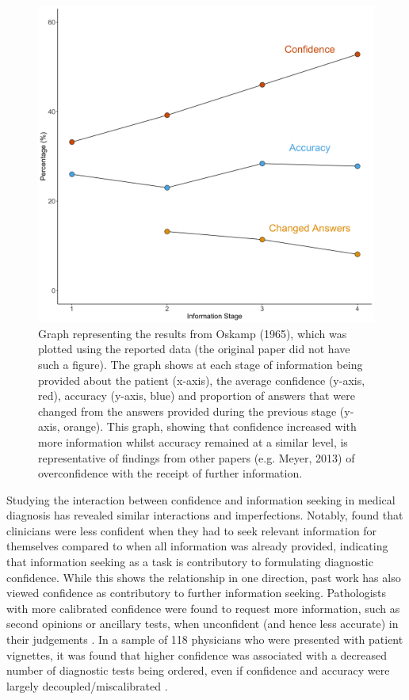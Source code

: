 \documentclass[a4paper, nobind]{templates/ociamthesis}
\begin{document}
\newpage

\begin{figure}[H]

{\centering \includegraphics[width=1\linewidth]{./assets/OskampGraph} 

}

\caption[Graph representing the results from Oskamp (1965)]{Graph representing the results from Oskamp (1965), which was plotted using the reported data (the original paper did not have such a figure). The graph shows at each stage of information being provided about the patient (x-axis), the average confidence (y-axis, red), accuracy (y-axis, blue) and proportion of answers that were changed from the answers provided during the previous stage (y-axis, orange). This graph, showing that confidence increased with more information whilst accuracy remained at a similar level, is representative of findings from other papers (e.g. Meyer, 2013) of overconfidence with the receipt of further information.}\label{fig:oskamp}
\end{figure}

Studying the interaction between confidence and information seeking in medical diagnosis has revealed similar interactions and imperfections. Notably, \textcite{gruppen_information_1991} found that clinicians were less confident when they had to seek relevant information for themselves compared to when all information was already provided, indicating that information seeking as a task is contributory to formulating diagnostic confidence. While this shows the relationship in one direction, past work has also viewed confidence as contributory to further information seeking. Pathologists with more calibrated confidence were found to request more information, such as second opinions or ancillary tests, when unconfident (and hence less accurate) in their judgements \autocite{clayton_are_2023}. In a sample of 118 physicians who were presented with patient vignettes, it was found that higher confidence was associated with a decreased number of diagnostic tests being ordered, even if confidence and accuracy were largely decoupled/miscalibrated \autocite{meyer_physicians_2013}.
\end{document}
